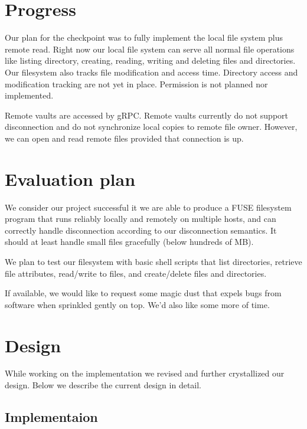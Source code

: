 \documentclass[a4paper,11pt,twoside,twocolumn]{extarticle}
\begin{document}
\section{Progress}
\label{sec:orgaf67f49}

Our plan for the checkpoint was to fully implement the local file system plus remote read. Right now our local file system can serve all normal file operations like listing directory, creating, reading, writing and deleting files and directories. Our filesystem also tracks file modification and access time. Directory access and modification tracking are not yet in place. Permission is not planned nor implemented.

Remote vaults are accessed by gRPC. Remote vaults currently do not support disconnection and do not synchronize local copies to remote file owner. However, we can open and read remote files provided that connection is up.

\section{Evaluation plan}
\label{sec:org38c3a61}

We consider our project successful it we are able to produce a FUSE filesystem program that runs reliably locally and remotely on multiple hosts, and can correctly handle disconnection according to our disconnection semantics. It should at least handle small files gracefully (below hundreds of MB).

We plan to test our filesystem with basic shell scripts that list directories, retrieve file attributes, read/write to files, and create/delete files and directories.

If available, we would like to request some magic dust that expels bugs from software when sprinkled gently on top. We’d also like some more of time.

\section{Design}
\label{sec:org05cbe91}

While working on the implementation we revised and further crystallized our design. Below we describe the current design in detail.

\subsection{Implementaion}
\label{sec:org6befe36}
\end{document}
